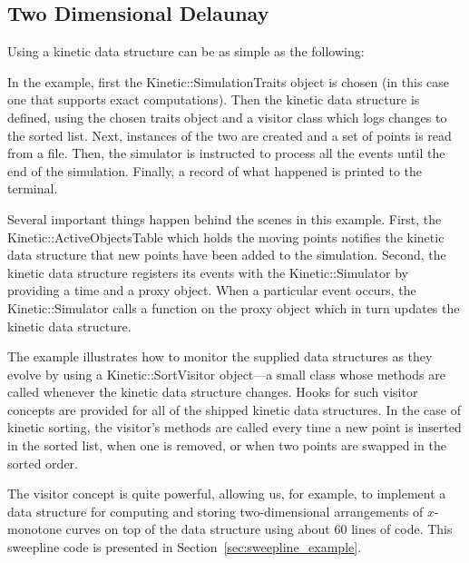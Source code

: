 \subsection{Two Dimensional Delaunay}
\label{sec:sort_example}

Using a kinetic data structure can be as simple as the following:
\label{fig:sort_program}

In the example, first the Kinetic::SimulationTraits object is chosen (in this
case one that supports exact computations). Then the kinetic data
structure is defined, using the chosen traits object and a visitor
class which logs changes to the sorted list.  Next, instances of the
two are created and a set of points is read from a file. Then, the
simulator is instructed to process all the events until the end of the
simulation.  Finally, a record of what happened is printed to the
terminal.

Several important things happen behind the scenes in this example.
First, the Kinetic::ActiveObjectsTable which holds the moving points
notifies the kinetic data structure that new points have been added to
the simulation. Second, the  kinetic data structure
registers its events with the Kinetic::Simulator by providing a time
and a proxy object. When a particular event occurs, the
Kinetic::Simulator calls a function on the proxy object which in turn
updates the kinetic data structure.

The example illustrates how to monitor the supplied data structures as
they evolve by using a Kinetic::SortVisitor object---a small class whose
methods are called whenever the kinetic data structure changes. Hooks
for such visitor concepts are provided for all of the shipped kinetic
data structures. In the case of kinetic sorting, the visitor's
methods are called every time a new point is inserted in the sorted
list, when one is removed, or when two points are swapped in the
sorted order. 


The visitor concept is quite powerful, allowing us, for example, to
implement a data structure for computing and storing two-dimensional
arrangements of $x$-monotone curves on top of the
 data structure using about 60
lines of code. This sweepline code is presented in
Section~\ref{sec:sweepline_example}.
